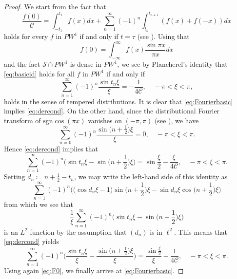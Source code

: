 \documentclass[12pt]{amsart}
\theoremstyle{plain}
\numberwithin{equation}{section}
\theoremstyle{definition}
\newcommand{\sgn}{\mathrm{sgn}}
\newcommand{\Cone}{\mathscr{C}}
\begin{document}
\begin{proof}
We start from the fact that
\begin{equation} \label{eq:basicid} \frac{f(0)}{\Cone}=\int_{-t_1}^{t_1} f(x) dx + \sum_{n=1}^\infty (-1)^n \int_{t_n}^{t_{n+1}} (f(x)+f(-x)) dx \end{equation}
holds for every $f$ in $PW^1$ if and only if $t=\tau$ (see \cite[Thm. 3.6]{BCOS}).
Using that
\[ f(0)=  \int_{-\infty}^\infty f(x) \frac{\sin \pi x}{\pi x} dx\]
and the fact $\mathcal{S}\cap PW^1$ is dense in $PW^1$,
we see by Plancherel's identity that \eqref{eq:basicid} holds for all $f$ in $PW^1$ if and only if
\begin{equation} \label{eq:Fourierbasic}  \sum_{n=1}^\infty  (-1)^n \frac{\sin t_n \xi}{\xi} = - \frac{1}{4\Cone}, \quad -\pi < \xi < \pi ,\end{equation}
holds in the sense of tempered distributions. It is clear that \eqref{eq:Fourierbasic} implies \eqref{eq:dercond}. On the other hand, since the distributional Fourier transform of $\sgn \cos(\pi x)$
vanishes on $(-\pi,\pi)$ (see \cite[p. 188]{HB93}),  we have
\begin{equation}\label{eq:F0}  \sum_{n=0}^\infty  (-1)^{n}\frac{\sin \big(n+\frac12\big) \xi}{\xi} =0 , \quad -\pi < \xi < \pi. \end{equation} Hence \eqref{eq:dercond} implies that
\[  \sum_{n=1}^\infty  (-1)^{n}\big(\sin t_n \xi-\sin \big(n+\frac12\big) \xi \big) =  \sin \frac{\xi}{2} - \frac{\xi}{4\Cone}, \quad -\pi < \xi < \pi. \]
Setting $d_n\coloneqq n+\frac12-t_n$, we may write the left-hand side of this identity as
\[  \sum_{n=1}^\infty  (-1)^{n}\big(\big(\cos d_n \xi - 1\big) \sin \big(n+\frac12\big) \xi -\sin d_n \xi \cos\big(n+\frac12\big)  \xi \big) \]
from which we see that
\[  \frac{1}{\xi} \sum_{n=1}^\infty  (-1)^{n}\big(\sin t_n \xi-\sin \big(n+\frac12\big) \xi \big) \]
is an $L^2$ function by the assumption that $(d_n)$ is in $\ell^2$. This means that \eqref{eq:dercond} yields
\begin{equation} \label{eq:sumC}  \sum_{n=1}^\infty  (-1)^{n}\Big(\frac{\sin t_n \xi}{\xi}-\frac{\sin \big(n+\frac12\big) \xi}{\xi} \Big) =  \frac{\sin \frac{\xi}{2}}{\xi} - \frac{1}{4\Cone}, \quad -\pi < \xi < \pi. \end{equation}
Using again \eqref{eq:F0}, we finally arrive at \eqref{eq:Fourierbasic}.
\end{proof}
\end{document}
